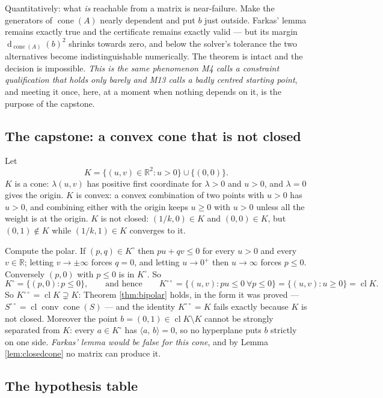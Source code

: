 \documentclass[11pt,a4paper]{article}
\theoremstyle{definition}
\theoremstyle{plain}
\theoremstyle{remark}
\newcommand{\R}{\mathbb{R}}
\newcommand{\ip}[2]{\langle #1,\, #2\rangle}
\DeclareMathOperator{\conv}{conv}
\DeclareMathOperator{\cone}{cone}
\DeclareMathOperator{\cl}{cl}
\DeclareMathOperator{\dist}{d}
\begin{document}
Quantitatively: what \emph{is} reachable from a matrix is near-failure. Make the generators of
$\cone(A)$ nearly dependent and put $b$ just outside. Farkas' lemma remains exactly true and the
certificate remains exactly valid --- but its margin $\dist_{\cone(A)}(b)^2$ shrinks towards
zero, and below the solver's tolerance the two alternatives become indistinguishable
numerically. The theorem is intact and the decision is impossible. \emph{This is the same
phenomenon M4 calls a constraint qualification that holds only barely and M13 calls a badly
centred starting point}, and meeting it once, here, at a moment when nothing depends on it, is
the purpose of the capstone.

\subsection*{The capstone: a convex cone that is not closed}

Let
\[
K=\{(u,v)\in\R^2:u>0\}\cup\{(0,0)\} .
\]
$K$ is a cone: $\lambda(u,v)$ has positive first coordinate for $\lambda>0$ and $u>0$, and
$\lambda=0$ gives the origin. $K$ is convex: a convex combination of two points with $u>0$ has
$u>0$, and combining either with the origin keeps $u\ge0$ with $u>0$ unless all the weight is at
the origin. $K$ is not closed: $(1/k,0)\in K$ and $(0,0)\in K$, but $(0,1)\notin K$ while
$(1/k,1)\in K$ converges to it.

Compute the polar. If $(p,q)\in K^\circ$ then $pu+qv\le0$ for every $u>0$ and every $v\in\R$;
letting $v\to\pm\infty$ forces $q=0$, and letting $u\to0^+$ then $u\to\infty$ forces $p\le0$.
Conversely $(p,0)$ with $p\le0$ is in $K^\circ$. So
\[
K^\circ=\{(p,0):p\le0\},\qquad\text{and hence}\qquad
K^{\circ\circ}=\{(u,v):pu\le0\ \forall p\le0\}=\{(u,v):u\ge0\}=\cl K .
\]
So $K^{\circ\circ}=\cl K\supsetneq K$: Theorem \ref{thm:bipolar} holds, in the form it was
proved --- $S^{\circ\circ}=\cl\conv\cone(S)$ --- and the identity $K^{\circ\circ}=K$ fails
exactly because $K$ is not closed. Moreover the point $b=(0,1)\in\cl K\setminus K$ cannot be
strongly separated from $K$: every $a\in K^\circ$ has $\ip{a}{b}=0$, so no hyperplane puts $b$
strictly on one side. \emph{Farkas' lemma would be false for this cone}, and by Lemma
\ref{lem:closedcone} no matrix can produce it.

\subsection*{The hypothesis table}
\end{document}
